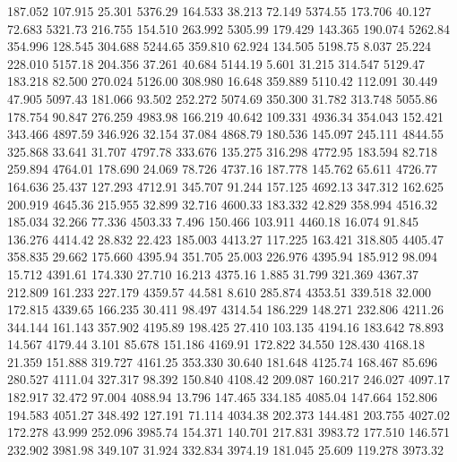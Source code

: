  187.052  107.915   25.301      5376.29
 164.533   38.213   72.149      5374.55
 173.706   40.127   72.683      5321.73
 216.755  154.510  263.992      5305.99
 179.429  143.365  190.074      5262.84
 354.996  128.545  304.688      5244.65
 359.810   62.924  134.505      5198.75
   8.037   25.224  228.010      5157.18
 204.356   37.261   40.684      5144.19
   5.601   31.215  314.547      5129.47
 183.218   82.500  270.024      5126.00
 308.980   16.648  359.889      5110.42
 112.091   30.449   47.905      5097.43
 181.066   93.502  252.272      5074.69
 350.300   31.782  313.748      5055.86
 178.754   90.847  276.259      4983.98
 166.219   40.642  109.331      4936.34
 354.043  152.421  343.466      4897.59
 346.926   32.154   37.084      4868.79
 180.536  145.097  245.111      4844.55
 325.868   33.641   31.707      4797.78
 333.676  135.275  316.298      4772.95
 183.594   82.718  259.894      4764.01
 178.690   24.069   78.726      4737.16
 187.778  145.762   65.611      4726.77
 164.636   25.437  127.293      4712.91
 345.707   91.244  157.125      4692.13
 347.312  162.625  200.919      4645.36
 215.955   32.899   32.716      4600.33
 183.332   42.829  358.994      4516.32
 185.034   32.266   77.336      4503.33
   7.496  150.466  103.911      4460.18
  16.074   91.845  136.276      4414.42
  28.832   22.423  185.003      4413.27
 117.225  163.421  318.805      4405.47
 358.835   29.662  175.660      4395.94
 351.705   25.003  226.976      4395.94
 185.912   98.094   15.712      4391.61
 174.330   27.710   16.213      4375.16
   1.885   31.799  321.369      4367.37
 212.809  161.233  227.179      4359.57
  44.581    8.610  285.874      4353.51
 339.518   32.000  172.815      4339.65
 166.235   30.411   98.497      4314.54
 186.229  148.271  232.806      4211.26
 344.144  161.143  357.902      4195.89
 198.425   27.410  103.135      4194.16
 183.642   78.893   14.567      4179.44
   3.101   85.678  151.186      4169.91
 172.822   34.550  128.430      4168.18
  21.359  151.888  319.727      4161.25
 353.330   30.640  181.648      4125.74
 168.467   85.696  280.527      4111.04
 327.317   98.392  150.840      4108.42
 209.087  160.217  246.027      4097.17
 182.917   32.472   97.004      4088.94
  13.796  147.465  334.185      4085.04
 147.664  152.806  194.583      4051.27
 348.492  127.191   71.114      4034.38
 202.373  144.481  203.755      4027.02
 172.278   43.999  252.096      3985.74
 154.371  140.701  217.831      3983.72
 177.510  146.571  232.902      3981.98
 349.107   31.924  332.834      3974.19
 181.045   25.609  119.278      3973.32
